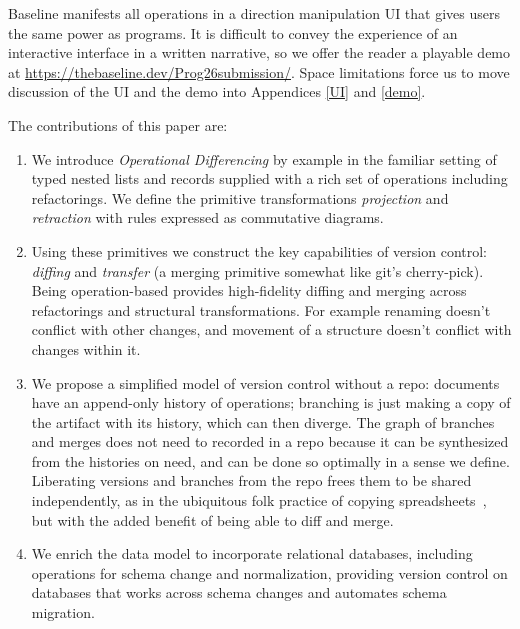 \documentclass[english,submission]{programming}
\theoremstyle{definition}
\begin{document}

Baseline manifests all operations in a direction manipulation UI that gives users the same power as programs.
It is difficult to convey the experience of an interactive interface in a written narrative, so we offer the reader a playable demo at \url{https://thebaseline.dev/Prog26submission/}.
Space limitations force us to move discussion of the UI and the demo into Appendices \ref{UI} and \ref{demo}.

The contributions of this paper are:

\begin{enumerate}

\item We introduce \textit{Operational Differencing} by example in the familiar setting of typed nested lists and records supplied with a rich set of operations
including refactorings. We define the primitive transformations \textit{projection} and \textit{retraction} with rules expressed as commutative diagrams.

\item Using these primitives we construct the key capabilities of version control: \textit{diffing} and \textit{transfer} (a merging primitive somewhat like git's cherry-pick). Being operation-based provides high-fidelity diffing and merging across refactorings and structural transformations. For example renaming doesn't conflict with other changes, and movement of a structure doesn't conflict with changes within it.

\item We propose a simplified model of version control without a repo: documents have an append-only history of operations; branching is just making a copy of the artifact with its history, which can then diverge. The graph of branches and merges does not need to recorded in a repo because it can be synthesized from the histories on need, and can be done so optimally in a sense we define. Liberating versions and branches from the repo frees them to be shared independently, as in the ubiquitous folk practice of copying spreadsheets~\cite{Burnett14, Basman19}, but with the added benefit of being able to diff and merge.

\item We enrich the data model to incorporate relational databases, including operations for schema change and normalization, providing version control on databases that works across schema changes and automates schema migration.


\end{enumerate}
\end{document}
